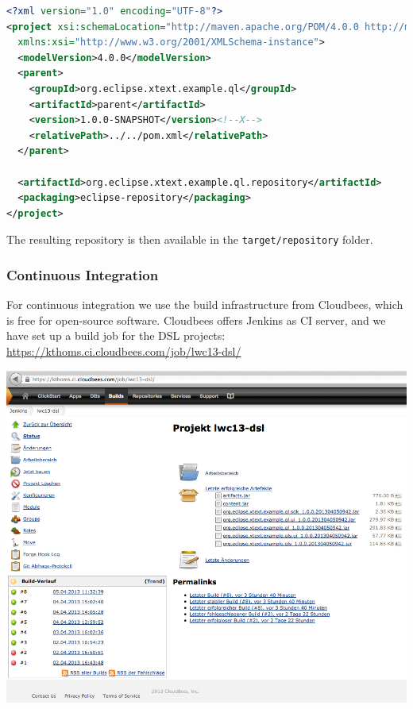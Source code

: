 \begin{lstlisting}[language=XML]
<?xml version="1.0" encoding="UTF-8"?>
<project xsi:schemaLocation="http://maven.apache.org/POM/4.0.0 http://maven.apache.org/xsd/maven-4.0.0.xsd" xmlns="http://maven.apache.org/POM/4.0.0"
  xmlns:xsi="http://www.w3.org/2001/XMLSchema-instance">
  <modelVersion>4.0.0</modelVersion>
  <parent>
    <groupId>org.eclipse.xtext.example.ql</groupId>
    <artifactId>parent</artifactId>
    <version>1.0.0-SNAPSHOT</version><!--X-->
    <relativePath>../../pom.xml</relativePath>
  </parent>

  <artifactId>org.eclipse.xtext.example.ql.repository</artifactId>
  <packaging>eclipse-repository</packaging>
</project>
\end{lstlisting}

The resulting repository is then available in the \texttt{target/repository} folder.

\subsubsection{Continuous Integration}
For continuous integration we use the build infrastructure from Cloudbees, which
is free for open-source software. Cloudbees offers Jenkins as CI server, and we
have set up a build job for the DSL projects:
\url{https://kthoms.ci.cloudbees.com/job/lwc13-dsl/}

\includegraphics[width=15cm]{images/chapter04/jenkins-1.png}

